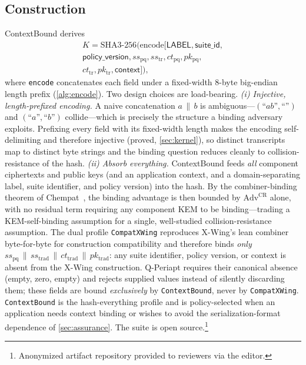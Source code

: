 \documentclass[journal]{IEEEtran}
\newcommand{\code}[1]{\texttt{\small #1}}
\newcommand{\K}{\ensuremath{K}}
\begin{document}
\subsection{Construction}
ContextBound derives
\begin{multline*}
\K=\mathrm{SHA3\text{-}256}\big(\mathrm{encode}[\textsf{LABEL},\textsf{suite\_id},\\
\textsf{policy\_version}, ss_{\mathrm{pq}}, ss_{\mathrm{tr}}, ct_{\mathrm{pq}}, pk_{\mathrm{pq}},\\
ct_{\mathrm{tr}}, pk_{\mathrm{tr}}, \textsf{context}]\big),
\end{multline*}
where \code{encode} concatenates each field under a fixed-width 8-byte big-endian length prefix
(\cref{alg:encode}). Two design choices are load-bearing. \emph{(i) Inject\-ive, length-prefixed
encoding.} A naive concatenation $a\,\|\,b$ is ambiguous---$(\text{``}ab\text{''},\text{``''})$ and
$(\text{``}a\text{''},\text{``}b\text{''})$ collide---which is precisely the structure a binding
adversary exploits. Prefixing every field with its fixed-width length makes the encoding
self-delimiting and therefore injective (proved, \cref{sec:kernel}), so distinct transcripts map to
distinct byte strings and the binding question reduces cleanly to collision-resistance of the hash.
\emph{(ii) Absorb everything.} ContextBound feeds \emph{all} component ciphertexts and public keys
(and an application context, and a domain-separating label, suite identifier, and policy version)
into the hash. By the combiner-binding theorem of Chempat~\cite{chempat}, the binding advantage is
then bounded by $\mathrm{Adv}^{\mathrm{CR}}$ alone, with no residual term requiring any component
KEM to be binding---trading a KEM-self-binding assumption for a single, well-studied
collision-resistance assumption. The dual profile \code{CompatXWing} reproduces X-Wing's lean
combiner byte-for-byte for construction compatibility and therefore binds \emph{only}
$ss_{\mathrm{pq}}\,\|\,ss_{\mathrm{trad}}\,\|\,ct_{\mathrm{trad}}\,\|\,pk_{\mathrm{trad}}$: any
suite identifier, policy version, or context is absent from the X-Wing construction. Q-Periapt
requires their canonical absence (empty, zero, empty) and rejects supplied values instead of
silently discarding them; these fields are bound \emph{exclusively} by \code{ContextBound}, never
by \code{CompatXWing}. \code{ContextBound}
is the hash-everything profile and is policy-selected when an application needs context binding or
wishes to avoid the serialization-format dependence of \cref{sec:assurance}. The suite is open
source.\footnote{Anonymized artifact repository provided to reviewers via the editor.}
\end{document}
